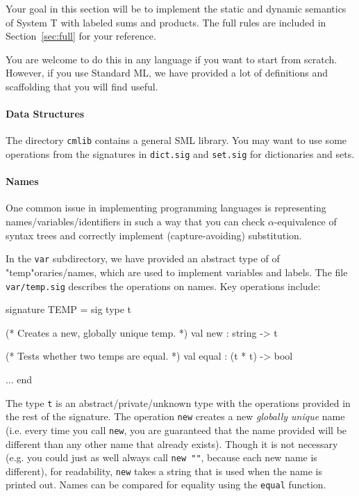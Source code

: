 \documentclass[11pt]{article}
\newcounter{rule}
\begin{document}
Your goal in this section will be to implement the static and dynamic
semantics of System T with labeled sums and products.  The full rules
are included in Section~\ref{sec:full} for your reference.

You are welcome to do this in any language if you want to start from
scratch.  However, if you use Standard ML, we have provided a lot of
definitions and scaffolding that you will find useful.  

\paragraph{Data Structures} The directory \texttt{cmlib} contains a general SML library.
You may want to use some operations from the signatures in
\texttt{dict.sig} and \texttt{set.sig} for dictionaries and sets.

\paragraph{Names}  One common issue in implementing programming
languages is representing names/variables/identifiers in such a way that
you can check $\alpha$-equivalence of syntax trees and correctly
implement (capture-avoiding) substitution.

In the \texttt{var} subdirectory, we have provided an abstract type of
of "temp"oraries/names, which are used to implement variables and
labels.  The file \texttt{var/temp.sig} describes the operations on
names.  Key operations include:

\begin{code}
signature TEMP =
sig
  type t

  (* Creates a new, globally unique temp. *)
  val new : string -> t

  (* Tests whether two temps are equal. *)
  val equal  : (t * t) -> bool

  ...
end
\end{code}

The type \texttt{t} is an abstract/private/unknown type with the
operations provided in the rest of the signature.  The operation
\texttt{new} creates a new \emph{globally unique} name (i.e. every time
you call \texttt{new}, you are guaranteed that the name provided will be
different than any other name that already exists).  Though it is not
necessary (e.g. you could just as well always call \verb|new ""|,
because each new name is different), for readability, \texttt{new} takes
a string that is used when the name is printed out.  Names can be
compared for equality using the \texttt{equal} function.
\end{document}
